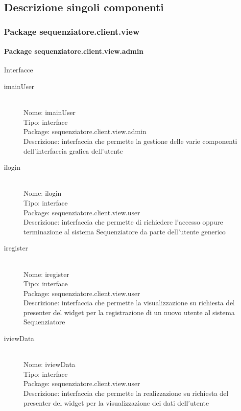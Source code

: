 \subsection{Descrizione singoli componenti}
\subsubsection{Package sequenziatore.client.view}
\paragraph{Package sequenziatore.client.view.admin}
Interfacce \\
\begin{description}
	\item[imainUser] 
  	\hfill \\
  	Nome: imainUser\\
  	Tipo: interface\\
	Package: sequenziatore.client.view.admin\\
	Descrizione: interfaccia che permette la gestione delle varie componenti 	dell'interfaccia grafica dell'utente
\end{description}

\begin{description}
	\item[ilogin] 
  	\hfill \\
  	Nome: ilogin\\
  	Tipo: interface\\
	Package: sequenziatore.client.view.user\\
	Descrizione: interfaccia che permette di richiedere l'accesso oppure terminazione al sistema Sequenziatore da parte dell’utente generico
\end{description}

\begin{description}
	\item[iregister] 
  	\hfill \\
  	Nome: iregister\\
  	Tipo: interface\\
	Package: sequenziatore.client.view.user\\
	Descrizione: interfaccia che permette la visualizzazione su richiesta del presenter del widget per la registrazione di un nuovo utente al sistema Sequenziatore
\end{description}

\begin{description}
	\item[iviewData] 
  	\hfill \\
  	Nome: iviewData\\
  	Tipo: interface\\
	Package: sequenziatore.client.view.user\\
	Descrizione: interfaccia che permette la realizzazione su richiesta del presenter del widget per la visualizzazione dei dati dell'utente
\end{description}


